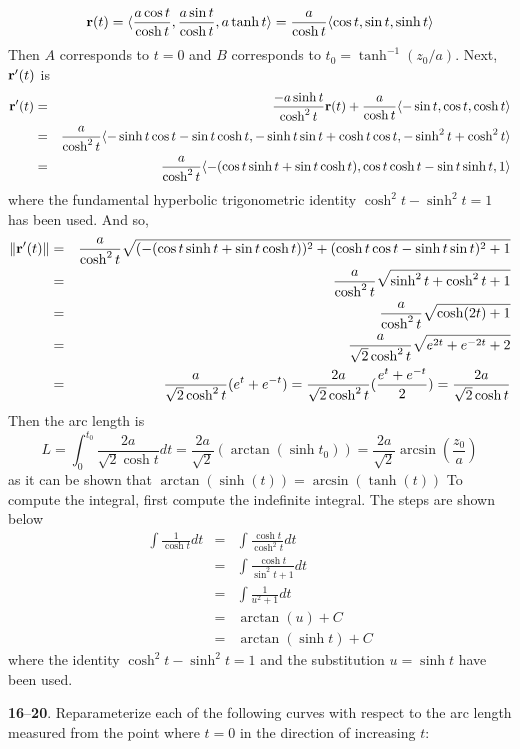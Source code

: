 \documentclass[12pt]{amsbook}
\newcommand{\la}{\langle}
\newcommand{\ra}{\rangle}
\begin{document}
\begin{enumerate}
  $${\bf r}(t)=\la \frac{a\cos t}{\cosh t}, \frac{a \sin t}{\cosh t}, a \tanh t \ra = \frac{a}{\cosh t} \la \cos t, \sin t, \sinh t \ra$$
  Then $A$ corresponds to $t=0$ and $B$ corresponds to $t_0=\tanh^{-1}(z_0/a)$. Next, ${\bf r}'(t)$ is
\begin{eqnarray*}
{\bf r}'(t)&=&\frac{-a\sinh t}{\cosh^2 t}{\bf r}(t)+\frac{a}{\cosh t}\la -\sin t, \cos t, \cosh t \ra \\
&=& \frac{a}{\cosh^2 t}\la -\sinh t \cos t - \sin t \cosh t, -\sinh t \sin t + \cosh t \cos t, -\sinh^2 t +\cosh^2 t \ra \\
&=& \frac{a}{\cosh^2 t}\la -(\cos t \sinh t+\sin t \cosh t ), \cos t \cosh t - \sin t \sinh t, 1 \ra
\end{eqnarray*} 
where the fundamental hyperbolic trigonometric identity $\cosh^2 t- \sinh^2 t=1$ has been used. And so, 
\begin{eqnarray*}
\|{\bf r}'(t)\|&=& \frac{a}{\cosh^2 t}\sqrt{(-(\cos t \sinh t+\sin t \cosh t ))^2+(\cosh t \cos t - \sinh t \sin t)^2+1}\\
&=&\frac{a}{\cosh^2 t}\sqrt{\sinh^2 t+\cosh^2 t +1}\\
&=&\frac{a}{\cosh^2 t}\sqrt{\cosh (2t) +1}\\
&=&\frac{a}{\sqrt{2}\cosh^2 t}\sqrt{e^{2t}+e^{-2t} +2}\\
&=&\frac{a}{\sqrt{2}\cosh^2 t}(e^t+e^{-t}) = \frac{2a}{\sqrt{2}\cosh^2 t}(\frac{e^t+e^{-t}}{2})=\frac{2a}{\sqrt{2}\cosh t}
\end{eqnarray*}
  Then the arc length is
  $$L=\int_0^{t_0}\frac{2a}{\sqrt{2}\cosh t}dt = \frac{2a}{\sqrt{2}}(\arctan(\sinh t_0))=\frac{2a}{\sqrt{2}}\arcsin(\frac{z_0}{a})$$
  as it can be shown that $\arctan(\sinh (t))=\arcsin(\tanh(t))$
  To compute the integral, first compute the indefinite integral. The steps are shown below
  \begin{eqnarray*}
  \int \frac{1}{\cosh t}dt &=& \int \frac{\cosh t}{\cosh^2 t}dt \\ 
  &=& \int \frac{\cosh t}{\sin^2 t+1}dt \\
  &=& \int \frac{1}{u^2+1}dt\\
  &=& \arctan(u)+C \\
  &=& \arctan(\sinh t)+C
  \end{eqnarray*}
  where the identity $\cosh^2 t -\sinh^2 t =1$ and the substitution $u=\sinh t $ have been used.
\end{enumerate}
\noindent
{\small {\bf 16}--{\bf 20}}. Reparameterize each of the following curves with respect to the arc
length measured from the point where $t = 0$ in the direction of increasing $t$:
\end{document}
